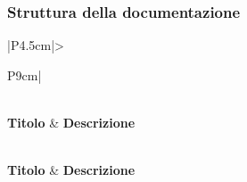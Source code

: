 \subsubsection{Struttura della documentazione}

\bgroup
\begin{adjustwidth}{-0.5cm}{-0.5cm}
  \begin{longtable}{|P{4.5cm}|>{\raggedright\arraybackslash}P{9cm}|}
    \caption{Checklist - Struttura della documentazione}
  	\label{tab:check-struttura-documentazione} \\
    \hline
		\textbf{Titolo} & \textbf{Descrizione} \\ 
		\hline
		\endfirsthead

    \caption[]{Checklist - Struttura della documentazione (continua)} \\
		\hline
		\textbf{Titolo} & \textbf{Descrizione} \\ 
		\hline
		\endhead

		\hline
		 \\ 
		\hline
		\endfoot

		\hline
		\endlastfoot


\end{longtable}
\end{adjustwidth}
